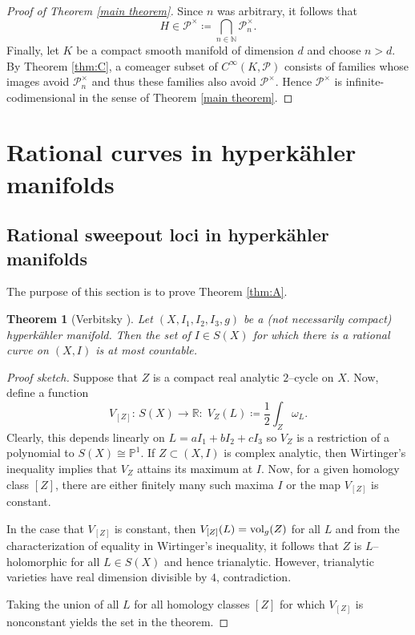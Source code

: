 \documentclass[11pt,a4paper]{article}
\newtheorem{theorem}{Theorem}[section]
\theoremstyle{definition}
\newcommand{\vol}{\textnormal{vol}}
\newcommand{\cP}{\mathcal{P}}
\newcommand{\bN}{\mathbb{N}}
\newcommand{\bR}{\mathbb{R}}
\newcommand{\bP}{\mathbb{P}}
\begin{document}
\begin{proof}[Proof of Theorem \ref{main theorem}]
Since $n$ was arbitrary, it follows that
\begin{equation*}
    H \in \cP^\times \coloneq \bigcap_{n\in \bN} \cP^\times_n.
\end{equation*}
Finally, let $K$ be a compact smooth manifold of dimension $d$ and choose $n>d$. By Theorem \ref{thm:C}, a comeager subset of $C^\infty(K, \cP)$ consists of families whose images avoid $\cP^\times_n$ and thus these families also avoid $\cP^\times$. Hence $\cP^\times$ is infinite-codimensional in the sense of Theorem \ref{main theorem}.
\end{proof}
\section{Rational curves in hyperkähler manifolds}\label{Rational curves in hyperkähler manifolds}

\subsection{Rational sweepout loci in hyperkähler manifolds}
The purpose of this section is to prove Theorem \ref{thm:A}. 

\begin{theorem}[{Verbitsky \cite[Theorem 1.2]{Verbitsky2004}}] \label{Verbitsky's theorem}
  Let $(X, I_1, I_2, I_3, g)$ be a (not necessarily compact) hyperkähler manifold. Then the set of $I \in S(X)$ for which there is a rational curve on $(X, I)$ is at most countable. 
\end{theorem}

\begin{proof}[Proof sketch]
  Suppose that $Z$ is a compact real analytic $2$--cycle on $X$. Now, define a function
  \begin{equation*}
    V_{[Z]}: \, S(X) \to \bR: \; V_Z(L) \coloneq \frac{1}{2} \int_Z \omega_L.
  \end{equation*}
  Clearly, this depends linearly on $L = a I_1 +b I_2 + c I_3$ so $V_Z$ is a restriction of a polynomial to $S(X) \cong \bP^1$.  If $Z\subset (X, I)$ is complex analytic, then Wirtinger's inequality implies that $V_Z$ attains its maximum at $I$. Now, for a given homology class $[Z]$, there are either finitely many such maxima $I$ or the map $V_{[Z]}$ is constant. 
  
  In the case that $V_{[Z]}$ is constant, then $V_{[Z]}(L)= \vol_g(Z)$ for all $L$ and from the characterization of equality in Wirtinger's inequality, it follows that $Z$ is $L$--holomorphic for all $L \in S(X)$ and hence trianalytic. However, trianalytic varieties have real dimension divisible by $4$, contradiction.

  Taking the union of all $L$ for all homology classes $[Z]$ for which $V_{[Z]}$ is nonconstant yields the set in the theorem.
\end{proof}
\end{document}
